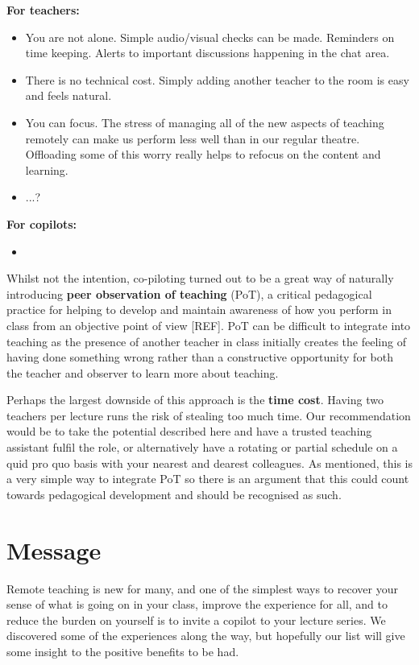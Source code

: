 \documentclass{article}
\begin{document}
\textbf{For teachers:}
\begin{itemize}
  \item You are not alone. Simple audio/visual checks can be made. Reminders on time keeping. Alerts to important discussions happening in the chat area.
  \item There is no technical cost. Simply adding another teacher to the room is easy and feels natural.
  \item You can focus. The stress of managing all of the new aspects of teaching remotely can make us perform less well than in our regular theatre. Offloading some of this worry really helps to refocus on the content and learning.
  \item ...?
\end{itemize}

\textbf{For copilots:}
\begin{itemize}
  \item
\end{itemize}

Whilst not the intention, co-piloting turned out to be a great way of naturally introducing \textbf{peer observation of teaching} (PoT), a critical pedagogical practice for helping to develop and maintain awareness of how you perform in class from an objective point of view [REF]. PoT can be difficult to integrate into teaching as the presence of another teacher in class initially creates the feeling of having done something wrong rather than a constructive opportunity for both the teacher and observer to learn more about teaching.

Perhaps the largest downside of this approach is the \textbf{time cost}. Having two teachers per lecture runs the risk of stealing too much time. Our recommendation would be to take the potential described here and have a trusted teaching assistant fulfil the role, or alternatively have a rotating or partial schedule on a quid pro quo basis with your nearest and dearest colleagues. As mentioned, this is a very simple way to integrate PoT so there is an argument that this could count towards pedagogical development and should be recognised as such.

\section*{Message}
Remote teaching is new for many, and one of the simplest ways to recover your sense of what is going on in your class, improve the experience for all, and to reduce the burden on yourself is to invite a copilot to your lecture series. We discovered some of the experiences along the way, but hopefully our list will give some insight to the positive benefits to be had.



\end{document}
